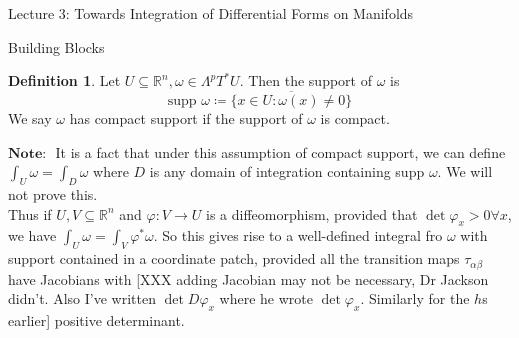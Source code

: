 \documentclass[10pt]{article}
\theoremstyle{plain}
\theoremstyle{definition}
\newtheorem{defn}[thm]{Definition} %
\newcommand{\Note}{\textbf{Note: }}
\newcommand{\Real}{\mathbb{R}}
\newcommand{\trans}{\tau_{\alpha\beta}}
\newcommand{\setform}[2]{\Lambda^{#1} {#2}}
\begin{document}
\begin{section}{Lecture 3: Towards Integration of Differential Forms on Manifolds}
\begin{subsection}{Building Blocks}
\begin{defn}
Let $U\subseteq \Real^n, \omega \in \setform{p}{T^*U}.$ Then the support of $\omega$ is
$$\text{supp } \omega \coloneqq \overline{\{x\in U : \omega(x) \neq 0 \}}$$
We say $\omega$ has compact support if the support of $\omega $ is compact.
\end{defn}
$\Note$ It is a fact that under this assumption of compact support,  we can define $\int_U \omega = \int_D \omega$ where $D$ is any domain of integration containing supp $\omega$. We will not prove this.\\
Thus if $U,V \subseteq \Real^n$ and $\varphi:V \to U$ is a diffeomorphism, provided that $\det \varphi_x > 0 \forall x$, we have $\int_U \omega = \int_V \varphi^* \omega$. So this gives rise to a well-defined integral fro $\omega $ with support contained in a coordinate patch, provided all the transition maps $\trans $ have Jacobians with [XXX adding Jacobian may not be necessary, Dr Jackson didn't. Also I've written $\det D\varphi_x $ where he wrote $\det \varphi_x$. Similarly for the $h$s earlier] positive determinant.
\end{subsection}
\end{section}
\end{document}
